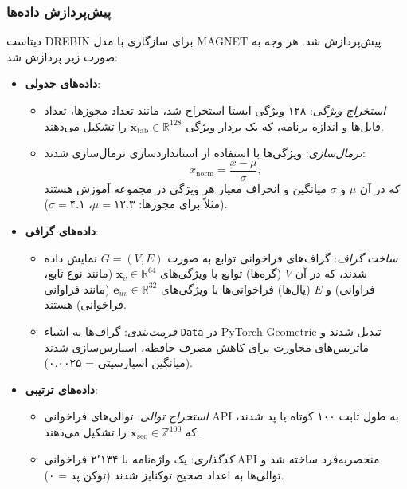 \subsubsection{پیش‌پردازش داده‌ها}
دیتاست DREBIN برای سازگاری با مدل MAGNET پیش‌پردازش شد. هر وجه به صورت زیر پردازش شد:

\begin{itemize}
    \item \textbf{داده‌های جدولی}:
        \begin{itemize}
            \item \textit{استخراج ویژگی}: ۱۲۸ ویژگی ایستا استخراج شد، مانند تعداد مجوزها، تعداد فایل‌ها و اندازه برنامه، که یک بردار ویژگی \( \mathbf{x}_{\text{tab}} \in \mathbb{R}^{128} \) را تشکیل می‌دهند.
            \item \textit{نرمال‌سازی}: ویژگی‌ها با استفاده از استانداردسازی نرمال‌سازی شدند:
            \[
            x_{\text{norm}} = \frac{x - \mu}{\sigma},
            \]
            که در آن \( \mu \) و \( \sigma \) میانگین و انحراف معیار هر ویژگی در مجموعه آموزش هستند (مثلاً برای مجوزها: \( \mu = ۱۲.۳ \)، \( \sigma = ۴.۱ \)).
        \end{itemize}
    \item \textbf{داده‌های گرافی}:
        \begin{itemize}
            \item \textit{ساخت گراف}: گراف‌های فراخوانی توابع به صورت \( G = (V, E) \) نمایش داده شدند، که در آن \( V \) (گره‌ها) توابع با ویژگی‌های \( \mathbf{x}_v \in \mathbb{R}^{64} \) (مانند نوع تابع، فراوانی) و \( E \) (یال‌ها) فراخوانی‌ها با ویژگی‌های \( \mathbf{e}_{uv} \in \mathbb{R}^{32} \) (مانند فراوانی فراخوانی) هستند.
            \item \textit{فرمت‌بندی}: گراف‌ها به اشیاء \texttt{Data} در PyTorch Geometric تبدیل شدند و ماتریس‌های مجاورت برای کاهش مصرف حافظه، اسپارس‌سازی شدند (میانگین اسپارسیتی = ۰.۰۰۲۵).
        \end{itemize}
    \item \textbf{داده‌های ترتیبی}:
        \begin{itemize}
            \item \textit{استخراج توالی}: توالی‌های فراخوانی API به طول ثابت ۱۰۰ کوتاه یا پد شدند، که \( \mathbf{x}_{\text{seq}} \in \mathbb{Z}^{100} \) را تشکیل می‌دهند.
            \item \textit{کدگذاری}: یک واژه‌نامه با ۲٬۱۳۴ فراخوانی API منحصربه‌فرد ساخته شد و توالی‌ها به اعداد صحیح توکنایز شدند (توکن پد = ۰).
        \end{itemize}
\end{itemize}

